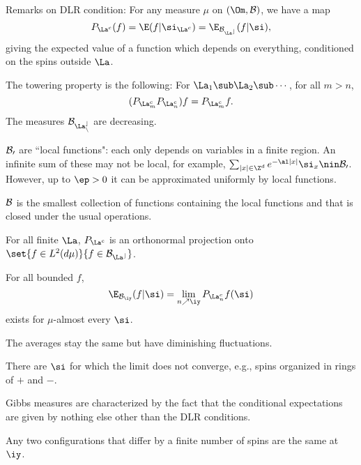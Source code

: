 

Remarks on DLR condition: For any measure $\mu$ on $(\Om, \cal B)$, we have a map
\[
P_{\La^c}(f) = \E(f|\si_{\La^c}) = \E_{\cal B_{\La^c}}(f|\si),
\]
giving the expected value of a function which depends on everything, conditioned on the spins outside $\La$.

The towering property is the following: For $\La_1\sub \La_2\sub\cdots$, for all $m>n$,
\[
(P_{\La_m^c}P_{\La_n^c})f = P_{\La_m^c}f.
\]
The measures $\cal B_{\La_n^c}$ are decreasing.

$\cal B_0$ are ``local functions": each only depends on variables in a finite region. An infinite sum of these may not be local, for example, $\sum_{|x|\in \Z^d} e^{-\al|x|} \si_x\nin \cal B_0$. However, up to $\ep>0$ it can be approximated uniformly by local functions.

$\cal B$ is the smallest collection of functions containing the local functions and that is closed under the usual operations.

For all finite $\La$, $P_{\La^c}$ is an orthonormal projection onto $\set{f\in L^2(d\mu)}{f\in \cal B_{\La^c}}$. 
\begin{thm}
For all bounded $f$, 
\[
\E_{\cal B_\iy} (f|\si)=\lim_{n\nearrow \iy} P_{\La_n^c} f(\si) 
\]
exists for $\mu$-almost every $\si$.
\end{thm}
The averages stay the same but have diminishing fluctuations.

There are $\si$ for which the limit does not converge, e.g., spins organized in rings of $+$ and $-$.

Gibbs measures are characterized by the fact that the conditional expectations are given by nothing else other than the DLR conditions. 

Any two configurations that differ by a finite number of spins are the same at $\iy$. 

